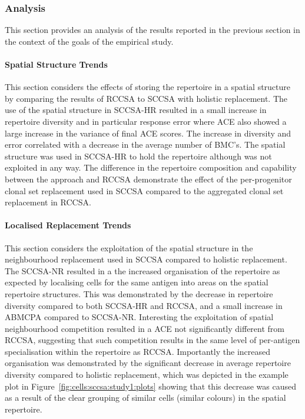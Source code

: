 %
%
\subsubsection{Analysis}
This section provides an analysis of the results reported in the previous section in the context of the goals of the empirical study. 

%
%
\paragraph{Spatial Structure Trends}
This section considers the effects of storing the repertoire in a spatial structure by comparing the results of RCCSA to SCCSA with holistic replacement.
The use of the spatial structure in SCCSA-HR resulted in a small increase in repertoire diversity and in particular response error where ACE also showed a large increase in the variance of final ACE scores. The increase in diversity and error correlated with a decrease in the average number of BMC's.
The spatial structure was used in SCCSA-HR to hold the repertoire although was not exploited in any way. The difference in the repertoire composition and capability between the approach and RCCSA demonstrate the effect of the per-progenitor clonal set replacement used in SCCSA compared to the aggregated clonal set replacement in RCCSA.

%
%
\paragraph{Localised Replacement Trends}
This section considers the exploitation of the spatial structure in the neighbourhood replacement used in SCCSA compared to holistic replacement.
The SCCSA-NR resulted in a the increased organisation of the repertoire as expected by localising cells for the same antigen into areas on the spatial repertoire structures. This was demonstrated by the decrease in repertoire diversity compared to both SCCSA-HR and RCCSA, and a small increase in ABMCPA compared to SCCSA-NR. Interesting the exploitation of spatial neighbourhood competition resulted in a ACE not significantly different from RCCSA, suggesting that such competition results in the same level of per-antigen specialisation within the repertoire as RCCSA. Importantly the increased organisation was demonstrated by the significant decrease in average repertoire diversity compared to holistic replacement, which was depicted in the example plot in Figure~\ref{fig:cells:sccsa:study1:plots} showing that this decrease was caused as a result of the clear grouping of similar cells (similar colours) in the spatial repertoire.

